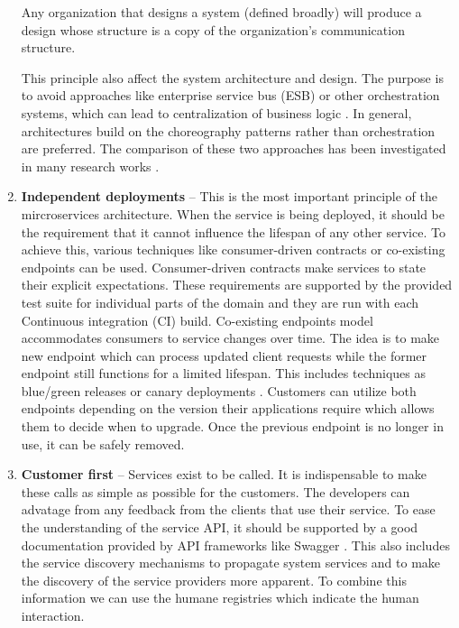 \documentclass[oneside,
  digital, %
  table,   %
  nolof,     %
  nolot,     %
]{fithesis3}
\begin{document}
\begin{enumerate}
    \begin{displayquote}
       Any organization that designs a system (defined broadly) will produce a design whose structure is a copy of the organization's communication structure.
    \end{displayquote}

    This principle also affect the system architecture and design. The purpose is to avoid approaches like enterprise service bus (ESB) or other orchestration systems, which can lead to centralization of business logic \cite{building_ms}. In general, architectures build on the choreography patterns rather than orchestration are preferred. The comparison of these two approaches has been investigated in many research works \cite{chor_and_orch, service_oriented_design, realtime_ws_orch}.
	
	\item \textbf{Independent deployments} -- This is the most important principle of the mircroservices architecture. When the service is being deployed, it should be the requirement that it cannot influence the lifespan of any other service. To achieve this, various techniques like consumer-driven contracts or co-existing endpoints can be used. Consumer-driven contracts make services to state their explicit expectations. These requirements are supported by the provided test suite for individual parts of the domain and they are run with each Continuous integration (CI) build. Co-existing endpoints model accommodates consumers to service changes over time. The idea is to make new endpoint which can process updated client requests while the former endpoint still functions for a limited lifespan. This includes techniques as blue/green releases \cite{blue_green} or canary deployments \cite{canary_deploy}. Customers can utilize both endpoints depending on the version their applications require which allows them to decide when to upgrade. Once the previous endpoint is no longer in use, it can be safely removed.
	
	\item \textbf{Customer first} -- Services exist to be called. It is indispensable to make these calls as simple as possible for the customers. The developers can advatage from any feedback from the clients that use their service. To ease the understanding of the service API, it should be supported by a good documentation provided by API frameworks like Swagger \cite{swagger}. This also includes the service discovery mechanisms to propagate system services and to make the discovery of the service providers more apparent. To combine this information we can use the humane registries \cite{humane_registry} which indicate the human interaction. 
	

\end{enumerate}
\end{document}
